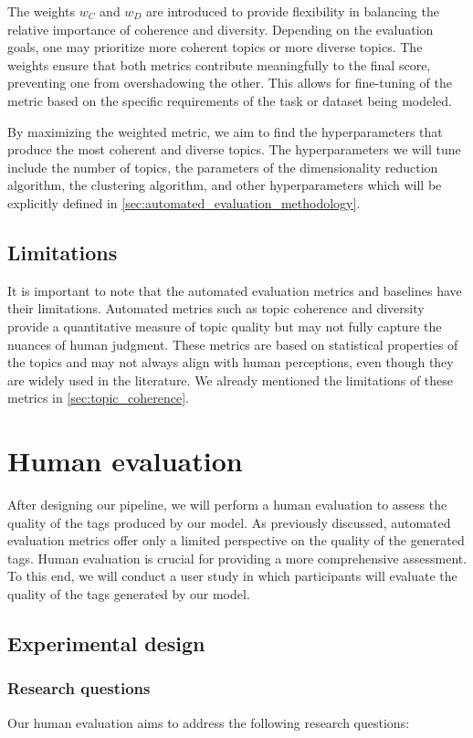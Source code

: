 The weights \( w_C \) and \( w_D \) are introduced to provide flexibility in balancing the relative importance of coherence and diversity. Depending on the evaluation goals, one may prioritize more coherent topics or more diverse topics. The weights ensure that both metrics contribute meaningfully to the final score, preventing one from overshadowing the other. This allows for fine-tuning of the metric based on the specific requirements of the task or dataset being modeled.

By maximizing the weighted metric, we aim to find the hyperparameters that produce the most coherent and diverse topics. The hyperparameters we will tune include the number of topics, the parameters of the dimensionality reduction algorithm, the clustering algorithm, and other hyperparameters which will be explicitly defined in \cref{sec:automated_evaluation_methodology}.

\subsection{Limitations}
It is important to note that the automated evaluation metrics and baselines have their limitations. Automated metrics such as topic coherence and diversity provide a quantitative measure of topic quality but may not fully capture the nuances of human judgment. These metrics are based on statistical properties of the topics and may not always align with human perceptions, even though they are widely used in the literature. We already mentioned the limitations of these metrics in \cref{sec:topic_coherence}.

\section{Human evaluation}
\label{sec:human_evaluation}
After designing our pipeline, we will perform a human evaluation to assess the quality of the tags produced by our model. As previously discussed, automated evaluation metrics offer only a limited perspective on the quality of the generated tags. Human evaluation is crucial for providing a more comprehensive assessment. To this end, we will conduct a user study in which participants will evaluate the quality of the tags generated by our model.

\subsection{Experimental design}
\subsubsection{Research questions}
Our human evaluation aims to address the following research questions:

